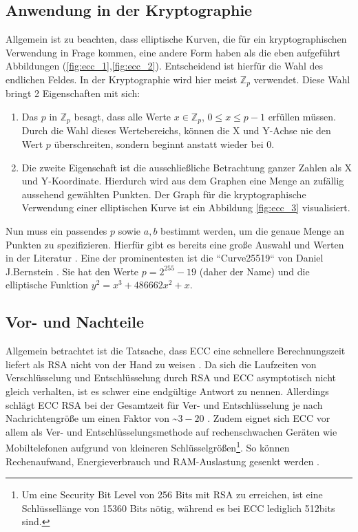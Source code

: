 \documentclass[
	fontsize=12pt,
	headings=small,
	parskip=half,           %
	bibliography=totoc,
	numbers=noenddot,       %
	open=any,               %
]{scrreprt}
\begin{document}
\subsection{Anwendung in der Kryptographie}
Allgemein ist zu beachten, dass elliptische Kurven, die für ein kryptographischen Verwendung in Frage kommen, eine andere Form haben als die eben aufgeführt Abbildungen (\ref{fig:ecc_1},\ref{fig:ecc_2}). Entscheidend ist hierfür die Wahl des endlichen Feldes. In der Kryptographie wird hier meist $\mathbb{Z}_p$ verwendet. Diese Wahl bringt 2 Eigenschaften mit sich:
\begin{enumerate}
    \item Das $p$ in $\mathbb{Z}_p$ besagt, dass alle Werte $x \in \mathbb{Z}_p$, $0 \leq x \leq p-1$ erfüllen müssen. Durch die Wahl dieses Wertebereichs, können die X und Y-Achse nie den Wert $p$ überschreiten, sondern beginnt anstatt wieder bei 0.
    \item Die zweite Eigenschaft ist die ausschließliche Betrachtung ganzer Zahlen als X und Y-Koordinate. Hierdurch wird aus dem Graphen eine Menge an zufällig aussehend gewählten Punkten. Der Graph für die kryptographische Verwendung einer elliptischen Kurve ist ein Abbildung \ref{fig:ecc_3} visualisiert.
\end{enumerate}
Nun muss ein passendes $p$ sowie $a,b$ bestimmt werden, um die genaue Menge an Punkten zu spezifizieren. Hierfür gibt es bereits eine große Auswahl und Werten in der Literatur \cite{ecc-lochter2010elliptic}\cite{ecc-merkle2013elliptic}. Eine der prominentesten ist die ``Curve25519`` von Daniel J.Bernstein \cite{ecc-bernstein2006curve25519}. Sie hat den Werte $p=2^{255}-19$ (daher der Name) und die elliptische Funktion $y^2=x^3+486662x^2+x$.


\subsection{Vor- und Nachteile}
Allgemein betrachtet ist die Tatsache, dass ECC eine schnellere Berechnungszeit liefert als RSA nicht von der Hand zu weisen \cite{ecc-cloud2013elliptic}. Da sich die Laufzeiten von Verschlüsselung und Entschlüsselung durch RSA und ECC asymptotisch nicht gleich verhalten, ist es schwer eine endgültige Antwort zu nennen. Allerdings schlägt ECC RSA bei der Gesamtzeit für Ver- und Entschlüsselung je nach Nachrichtengröße um einen Faktor von \textasciitilde $3-20$ \cite{ecc-mahto2018performance}\cite{ecc-bao2022research}. Zudem eignet sich ECC vor allem als Ver- und Entschlüsselungsmethode auf rechenschwachen Geräten wie Mobiltelefonen aufgrund von kleineren Schlüsselgrößen\footnote{Um eine Security Bit Level von 256 Bits mit RSA zu erreichen, ist eine Schlüssellänge von 15360 Bits nötig, während es bei ECC lediglich 512bits sind.\cite{ecc-mahto2018performance}}. So können Rechenaufwand, Energieverbrauch und RAM-Auslastung gesenkt werden \cite{ecc-gupta2011ecc}.
\end{document}
